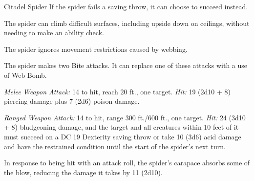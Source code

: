 \documentclass[10pt,a4paper,twoside,bg=print,twocolumn,openany,nodeprecatedcode]{dndbook}
\begin{document}
\begin{DndMonster}[float=t]{Citadel Spider}
\DndMonsterBasics[
armor-class = {18 (natural armor)},
hit-points = {\DndDice{20d20 + 150}},
speed = {50 ft., climb 50 ft.}
]
\DndMonsterAbilityScores[
 str = 26,
 dex = 10,
 con = 21,
 int = 6,
 wis = 12,
 cha = 9
]
\DndMonsterDetails[
condition-immunities = {charmed, exhaustion, frightened},
senses = {blindsight 30 ft., darkvision 120 ft., passive perception 11},
challenge = 18,
]
If the spider fails a saving throw, it can choose to succeed instead.

The spider can climb difficult surfaces, including upside down on ceilings, without needing to make an ability check.

The spider ignores movement restrictions caused by webbing.

The spider makes two Bite attacks. It can replace one of these attacks with a use of Web Bomb.

\textsl{Melee Weapon Attack:} 14 to hit, reach 20 ft., one target. \textsl{Hit:} 19 (2d10 + 8) piercing damage plus 7 (2d6) poison damage.

\textsl{Ranged Weapon Attack:} 14 to hit, range 300 ft./600 ft., one target. \textsl{Hit:} 24 (3d10 + 8) bludgeoning damage, and the target and all creatures within 10 feet of it must succeed on a DC 19 Dexterity saving throw or take 10 (3d6) acid damage and have the restrained condition until the start of the spider's next turn.

In response to being hit with an attack roll, the spider's carapace absorbs some of the blow, reducing the damage it takes by 11 (2d10).

\end{DndMonster}
\end{document}
